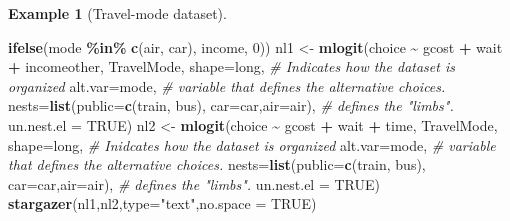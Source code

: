 \documentclass[
  12pt,
]{book}
\newenvironment{Shaded}{\begin{snugshade}}{\end{snugshade}}
\newcommand{\AttributeTok}[1]{\textcolor[rgb]{0.13,0.29,0.53}{#1}}
\newcommand{\CommentTok}[1]{\textcolor[rgb]{0.56,0.35,0.01}{\textit{#1}}}
\newcommand{\ConstantTok}[1]{\textcolor[rgb]{0.56,0.35,0.01}{#1}}
\newcommand{\DecValTok}[1]{\textcolor[rgb]{0.00,0.00,0.81}{#1}}
\newcommand{\FunctionTok}[1]{\textcolor[rgb]{0.13,0.29,0.53}{\textbf{#1}}}
\newcommand{\NormalTok}[1]{#1}
\newcommand{\OtherTok}[1]{\textcolor[rgb]{0.56,0.35,0.01}{#1}}
\newcommand{\SpecialCharTok}[1]{\textcolor[rgb]{0.81,0.36,0.00}{\textbf{#1}}}
\newcommand{\StringTok}[1]{\textcolor[rgb]{0.31,0.60,0.02}{#1}}
\theoremstyle{definition}
\theoremstyle{definition}
\newtheorem{example}{Example}[chapter]
\theoremstyle{definition}
\theoremstyle{definition}
\theoremstyle{remark}
\begin{document}
\begin{example}[Travel-mode dataset]
\begin{Shaded}
\begin{Highlighting}[]
                               \FunctionTok{ifelse}\NormalTok{(mode }\SpecialCharTok{\%in\%} \FunctionTok{c}\NormalTok{(}\StringTok{\textquotesingle{}air\textquotesingle{}}\NormalTok{, }\StringTok{\textquotesingle{}car\textquotesingle{}}\NormalTok{), income, }\DecValTok{0}\NormalTok{))}
\NormalTok{nl1 }\OtherTok{\textless{}{-}} \FunctionTok{mlogit}\NormalTok{(choice }\SpecialCharTok{\textasciitilde{}}\NormalTok{ gcost }\SpecialCharTok{+}\NormalTok{ wait }\SpecialCharTok{+}\NormalTok{ incomeother, TravelMode,}
              \AttributeTok{shape=}\StringTok{\textquotesingle{}long\textquotesingle{}}\NormalTok{, }\CommentTok{\# Indicates how the dataset is organized}
              \AttributeTok{alt.var=}\StringTok{\textquotesingle{}mode\textquotesingle{}}\NormalTok{, }\CommentTok{\# variable that defines the alternative choices.}
              \AttributeTok{nests=}\FunctionTok{list}\NormalTok{(}\AttributeTok{public=}\FunctionTok{c}\NormalTok{(}\StringTok{\textquotesingle{}train\textquotesingle{}}\NormalTok{, }\StringTok{\textquotesingle{}bus\textquotesingle{}}\NormalTok{),}
                         \AttributeTok{car=}\StringTok{\textquotesingle{}car\textquotesingle{}}\NormalTok{,}\AttributeTok{air=}\StringTok{\textquotesingle{}air\textquotesingle{}}\NormalTok{), }\CommentTok{\# defines the "limbs".}
              \AttributeTok{un.nest.el =} \ConstantTok{TRUE}\NormalTok{)}
\NormalTok{nl2 }\OtherTok{\textless{}{-}} \FunctionTok{mlogit}\NormalTok{(choice }\SpecialCharTok{\textasciitilde{}}\NormalTok{ gcost }\SpecialCharTok{+}\NormalTok{ wait }\SpecialCharTok{+}\NormalTok{ time, TravelMode,}
              \AttributeTok{shape=}\StringTok{\textquotesingle{}long\textquotesingle{}}\NormalTok{, }\CommentTok{\# Inidcates how the dataset is organized}
              \AttributeTok{alt.var=}\StringTok{\textquotesingle{}mode\textquotesingle{}}\NormalTok{, }\CommentTok{\# variable that defines the alternative choices.}
              \AttributeTok{nests=}\FunctionTok{list}\NormalTok{(}\AttributeTok{public=}\FunctionTok{c}\NormalTok{(}\StringTok{\textquotesingle{}train\textquotesingle{}}\NormalTok{, }\StringTok{\textquotesingle{}bus\textquotesingle{}}\NormalTok{),}
                         \AttributeTok{car=}\StringTok{\textquotesingle{}car\textquotesingle{}}\NormalTok{,}\AttributeTok{air=}\StringTok{\textquotesingle{}air\textquotesingle{}}\NormalTok{), }\CommentTok{\# defines the "limbs".}
              \AttributeTok{un.nest.el =} \ConstantTok{TRUE}\NormalTok{)}
\FunctionTok{stargazer}\NormalTok{(nl1,nl2,}\AttributeTok{type=}\StringTok{"text"}\NormalTok{,}\AttributeTok{no.space =} \ConstantTok{TRUE}\NormalTok{)}
\end{Highlighting}
\end{Shaded}


\end{example}
\end{document}
